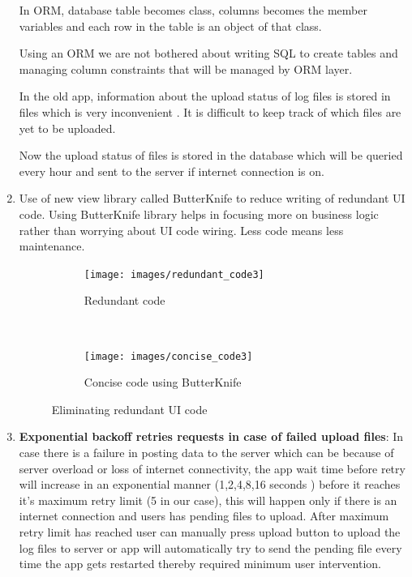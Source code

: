 \documentclass[12pt]{report}
\begin{document}
\begin{enumerate}
  In ORM, database table becomes class, columns becomes the member variables and
  each row in the table is an object of that class.

  Using an ORM we are not bothered about writing SQL to create tables and
  managing column constraints that will be managed by ORM layer.

  In the old app, information about the upload status of log files is stored in
  files which is very inconvenient . It is difficult to keep
  track of which files are yet to be uploaded.

  Now the upload status of files is stored in the database which will be queried
  every hour and sent to the server if internet connection is on.

\item Use of new view library called ButterKnife \cite{butterknife} to reduce
  writing of redundant UI code. Using ButterKnife library helps in focusing more on
  business logic rather than worrying about UI code wiring. Less code means less
  maintenance.
  \begin{figure}[h!]
    \centering
    \begin{subfigure}[t]{0.5\textwidth}
      \centering
      \texttt{[image: images/redundant\_code3]}
      \caption{Redundant code}
      \label{redundant_code_fig}
    \end{subfigure}%
    ~
    \begin{subfigure}[t]{0.5\textwidth}
      \centering
      \texttt{[image: images/concise\_code3]}
      \caption{Concise code using ButterKnife}
      \label{concise_code_fig}
    \end{subfigure}
    \caption{Eliminating redundant UI code}
    \label{redundant_concise_fig}
  \end{figure}

\item \textbf{Exponential backoff retries requests in case of failed upload
    files}: In case there is a failure in posting data to the server which can
  be because of server overload or loss of internet connectivity, the app wait
  time before retry will increase in an exponential manner (1,2,4,8,16 seconds )
  before it reaches it's maximum retry limit (5 in our case), this will happen only
  if there is an internet connection and users has pending files to upload.
  After maximum retry limit has reached user can manually press upload button to
  upload the log files to server or app will automatically try to send the
  pending file every time the app gets restarted thereby required minimum user
  intervention.

\end{enumerate}
\end{document}
